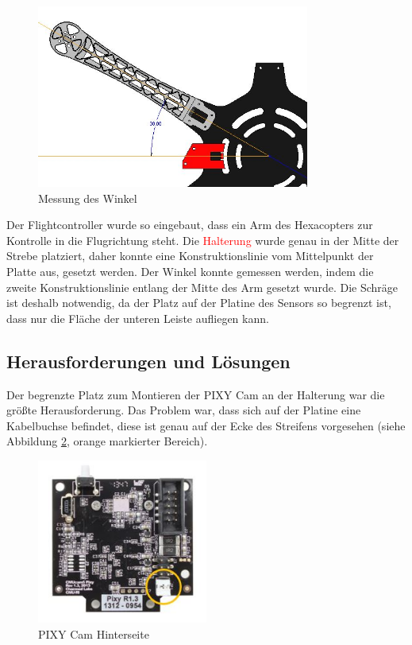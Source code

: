 			\begin{figure}[tbh]
			\begin{centering}
			\includegraphics[width = 0.8\textwidth]{Bilder/winkel_pixy}
			\par\end{centering}
			\caption{Messung des Winkel}
			\label{winkel_pixy}
			\end{figure}

	Der Flightcontroller wurde so eingebaut, dass ein Arm des Hexacopters zur Kontrolle in die Flugrichtung steht.
	Die \textcolor{red}{Halterung} wurde genau in der Mitte der Strebe platziert, daher konnte eine Konstruktionslinie vom Mittelpunkt der Platte aus, gesetzt werden.
	Der Winkel konnte gemessen werden, indem die zweite Konstruktionslinie entlang der Mitte des Arm gesetzt wurde.
	Die Schräge ist deshalb notwendig, da der Platz auf der Platine des Sensors so begrenzt ist, dass nur die Fläche der unteren Leiste aufliegen kann.

	\subsection{Herausforderungen und Lösungen}

	Der begrenzte Platz zum Montieren der PIXY Cam an der Halterung war die größte Herausforderung.
	Das  Problem war, dass sich auf der Platine eine Kabelbuchse befindet, diese ist genau auf der Ecke des Streifens vorgesehen (siehe Abbildung \ref{pixy_back}, orange markierter Bereich).

			\begin{figure}[tbh]
			\begin{centering}
			\includegraphics[width = 0.5\textwidth]{Bilder/pixy_back}
			\par\end{centering}
			\caption{PIXY Cam Hinterseite}
			\label{pixy_back}
			\end{figure}

